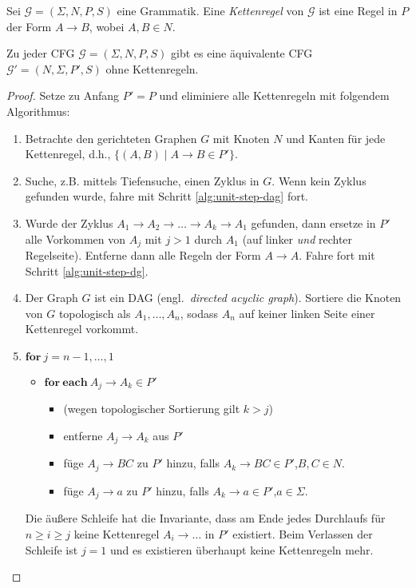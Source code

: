 \begin{Def}
  Sei $\mathcal{G} = (\Sigma, N, P, S)$ eine Grammatik.
  Eine \emph{Kettenregel} von $\mathcal{G}$ ist eine Regel in $P$ der Form $A \to B$, wobei $A,B \in N$.
\end{Def}

\begin{lemma}
  Zu jeder \ac{CFG} $\mathcal{G} = (\Sigma, N, P, S)$ gibt es eine äquivalente \ac{CFG} $\mathcal{G}' = (N, \Sigma, P', S)$ ohne Kettenregeln.
\end{lemma}
\begin{proof}
  Setze zu Anfang $P' = P$ und eliminiere alle Kettenregeln mit folgendem Algorithmus:
  \begin{enumerate}
  \item Betrachte den gerichteten Graphen $G$ mit Knoten $N$ und Kanten für jede Kettenregel, d.h., $\{(A, B) \mid A \to B \in P' \}$. \label{alg:unit-step-dg}
  \item Suche, z.B. mittels Tiefensuche, einen Zyklus in $G$.
    Wenn kein Zyklus gefunden wurde, fahre mit Schritt \ref{alg:unit-step-dag} fort.
  \item Wurde der Zyklus $A_1 \to A_2 \to \ldots \to A_k \to A_1$ gefunden, dann ersetze in $P'$ alle Vorkommen von $A_j$ mit $j > 1$ durch $A_1$ (auf linker \emph{und} rechter Regelseite).
    Entferne dann alle Regeln der Form $A \to A$.
    Fahre fort mit Schritt \ref{alg:unit-step-dg}.
  \item \label{alg:unit-step-dag}
    Der Graph $G$ ist ein \ac{DAG} (engl.\ \emph{directed acyclic graph}).
    Sortiere die Knoten von $G$ topologisch als $A_1, \ldots, A_n$, sodass $A_n$ auf keiner linken Seite einer Kettenregel vorkommt.
  \item $\mathbf{for}~j = n-1, \ldots, 1$ \label{alg:unit-step-chain}
    \begin{itemize}
    \item[] $\mathbf{for}~\mathbf{each}~A_j \to A_k \in P'$
      \begin{itemize}
      \item[] (wegen topologischer Sortierung gilt $k > j$)
      \item[] entferne $A_j \to A_k$ aus $P'$
      \item[] füge $A_j \to BC$ zu $P'$ hinzu, falls $A_k \to BC \in P'$,\quad $B,C \in N$.
      \item[] füge $A_j \to a$ zu $P'$ hinzu, falls $A_k \to a \in P'$,\quad $a \in \Sigma$.
      \end{itemize}
    \end{itemize}
    Die äußere Schleife hat die Invariante, dass am Ende jedes Durchlaufs für $n \ge i \ge j$ keine Kettenregel $A_i \to \ldots$ in $P'$ existiert.
    Beim Verlassen der Schleife ist $j = 1$ und es existieren überhaupt keine Kettenregeln mehr.
    \qedhere
  \end{enumerate}
\end{proof}
